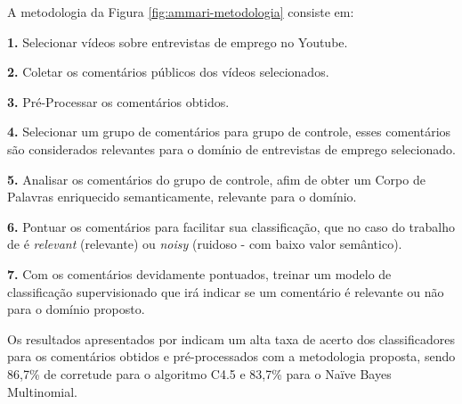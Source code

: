 A metodologia da Figura \ref{fig:ammari-metodologia} consiste em:

\textbf{1.} Selecionar vídeos sobre entrevistas de emprego no Youtube.

\textbf{2.} Coletar os comentários públicos dos vídeos selecionados.

\textbf{3.} Pré-Processar os comentários obtidos.

\textbf{4.} Selecionar um grupo de comentários para grupo de controle, esses comentários são considerados relevantes para o domínio de entrevistas de emprego selecionado.

\textbf{5.} Analisar os comentários do grupo de controle, afim de obter um Corpo de Palavras enriquecido semanticamente, relevante para o domínio.

\textbf{6.} Pontuar os comentários para facilitar sua classificação, que no caso do trabalho de  é \textit{relevant} (relevante) ou \textit{noisy} (ruidoso - com baixo valor semântico).

\textbf{7.} Com os comentários devidamente pontuados, treinar um modelo de classificação supervisionado que irá indicar se um comentário é relevante ou não para o domínio proposto.

Os resultados apresentados por  indicam um alta taxa de acerto dos classificadores para os comentários obtidos e pré-processados com a metodologia proposta, sendo 86,7\% de corretude para o algoritmo C4.5 e 83,7\% para o Naïve Bayes Multinomial.

